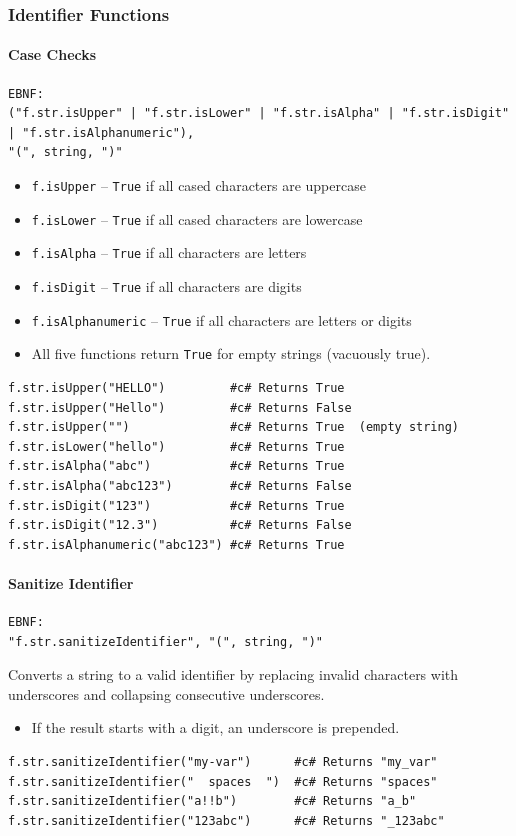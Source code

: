 \subsubsection{Identifier Functions}
\paragraph{Case Checks}
\begin{verbatim}
EBNF:
("f.str.isUpper" | "f.str.isLower" | "f.str.isAlpha" | "f.str.isDigit" | "f.str.isAlphanumeric"),
"(", string, ")"
\end{verbatim}
\begin{itemize}
\item \texttt{f.isUpper} -- \texttt{True} if all cased characters are uppercase
\item \texttt{f.isLower} -- \texttt{True} if all cased characters are lowercase
\item \texttt{f.isAlpha} -- \texttt{True} if all characters are letters
\item \texttt{f.isDigit} -- \texttt{True} if all characters are digits
\item \texttt{f.isAlphanumeric} -- \texttt{True} if all characters are letters or digits
\item All five functions return \texttt{True} for empty strings (vacuously true).
\end{itemize}
\begin{verbatim}
f.str.isUpper("HELLO")         #c# Returns True
f.str.isUpper("Hello")         #c# Returns False
f.str.isUpper("")              #c# Returns True  (empty string)
f.str.isLower("hello")         #c# Returns True
f.str.isAlpha("abc")           #c# Returns True
f.str.isAlpha("abc123")        #c# Returns False
f.str.isDigit("123")           #c# Returns True
f.str.isDigit("12.3")          #c# Returns False
f.str.isAlphanumeric("abc123") #c# Returns True
\end{verbatim}

\paragraph{Sanitize Identifier}
\begin{verbatim}
EBNF:
"f.str.sanitizeIdentifier", "(", string, ")"
\end{verbatim}
Converts a string to a valid identifier by replacing invalid characters with underscores and collapsing consecutive underscores.
\begin{itemize}
\item If the result starts with a digit, an underscore is prepended.
\end{itemize}
\begin{verbatim}
f.str.sanitizeIdentifier("my-var")      #c# Returns "my_var"
f.str.sanitizeIdentifier("  spaces  ")  #c# Returns "spaces"
f.str.sanitizeIdentifier("a!!b")        #c# Returns "a_b"
f.str.sanitizeIdentifier("123abc")      #c# Returns "_123abc"
\end{verbatim}


